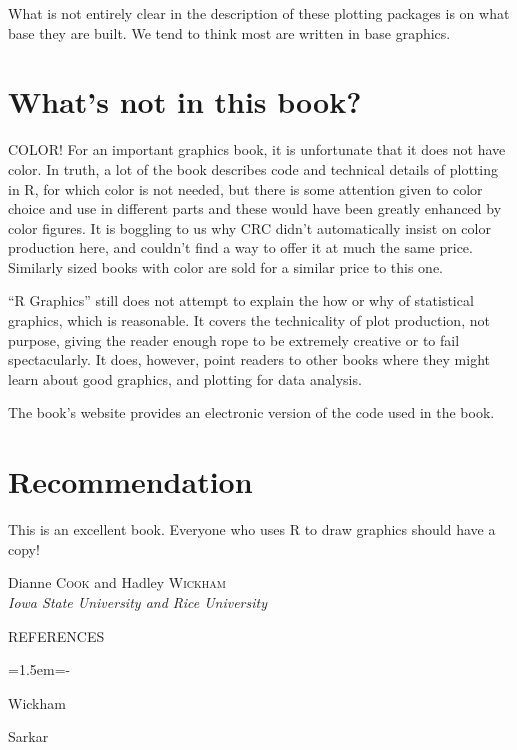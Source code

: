 \documentclass[12pt]{article}
\newenvironment{references}{
  \begin{center} \textsf{REFERENCES} \end{center}
  \begin{list}{}{\topsep=0pt\parsep=0pt\baselineskip=20pt
   \leftmargin=1.5em\itemindent=-\leftmargin}}
  {\end{list}}
\begin{document}
\noindent What is not entirely clear in the description of these plotting packages is on what base they are built. We tend to think  most are written in base graphics.

\section{What's not in this book?} 

COLOR! For an important graphics book, it is unfortunate that it does not
have color. In truth, a lot of the book describes code and technical
details of plotting in R, for which color is not needed, but there is some attention given to color choice and use in
different parts and these would have been greatly enhanced by color
figures. It is boggling to us why CRC didn't automatically insist on color
production here, and couldn't find a way to offer it at much the same
price. Similarly sized books with color are sold for a similar price
to this one.

``R Graphics'' still does not attempt to explain the how or why of
statistical graphics, which is reasonable.  It covers the technicality
of plot production, not purpose, giving the reader enough rope to be
extremely creative or to fail spectacularly. It does, however, point
readers to other books where they might learn about good graphics, and
plotting for data analysis.

The book's website provides an electronic version of
the code used in the book.

\section{Recommendation}

This is an excellent book. Everyone who uses R to draw graphics should have a copy! 

\begin{flushright}\def\baselinestretch{1}
Dianne \textsc{Cook} and Hadley \textsc{Wickham} \\ 
\emph{Iowa State University and Rice University}
\end{flushright}

\begin{references} 
\item Wickham

\item Sarkar
\end{references}
\end{document}
